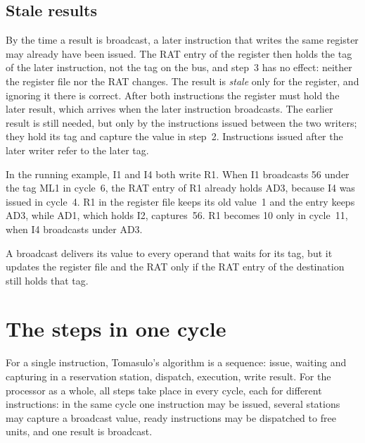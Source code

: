 \documentclass[../main.tex]{subfiles}
\begin{document}
\subsection{Stale results}
\label{sec:l07-stale}

By the time a result is broadcast, a later instruction that writes the same
register may already have been issued.
The RAT entry of the register then holds the tag of the later instruction,
not the tag on the bus, and step~3 has no effect: neither the register file
nor the RAT changes.  The result is \emph{stale} only for
the register, and ignoring
it there is correct.  After both instructions the register must hold the later
result, which arrives when the later instruction broadcasts.  The earlier
result is still needed, but only by the instructions issued between the two
writers; they hold its tag and capture the value in step~2.  Instructions
issued after the later writer refer to the later tag.

\begin{example}
  \label{ex:l07-stale}
  In the running example, I1 and I4 both write R1.  When I1 broadcasts 56
  under the tag ML1 in cycle~6, the RAT entry of R1 already holds AD3, because
  I4 was issued in cycle~4.  R1 in the register file keeps its old value~1
  and the entry keeps AD3, while AD1, which holds I2, captures~56.  R1 becomes
  10 only in cycle~11, when I4 broadcasts under AD3.
\end{example}

\begin{keypoint}
  A broadcast delivers its value to every operand that waits for its tag, but
  it updates the register file and the RAT only if the RAT entry of the
  destination still holds that tag.
\end{keypoint}

\section{The steps in one cycle}
\label{sec:l07-cycle}

For a single instruction, Tomasulo's algorithm is a sequence: issue, waiting
and capturing in a reservation station, dispatch, execution, write
result.  For the processor as a
whole, all steps take place in every cycle, each for different instructions:
in the same cycle one instruction may be issued, several stations may capture
a broadcast value, ready instructions may be dispatched to free units, and one
result is broadcast.
\end{document}

